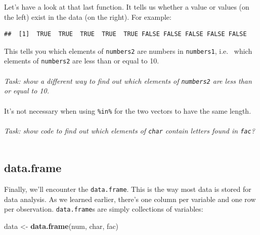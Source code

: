 \documentclass[
]{book}
\newenvironment{Shaded}{\begin{snugshade}}{\end{snugshade}}
\newcommand{\KeywordTok}[1]{\textcolor[rgb]{0.13,0.29,0.53}{\textbf{#1}}}
\newcommand{\NormalTok}[1]{#1}
\newcommand{\OperatorTok}[1]{\textcolor[rgb]{0.81,0.36,0.00}{\textbf{#1}}}
\newcommand{\StringTok}[1]{\textcolor[rgb]{0.31,0.60,0.02}{#1}}
\begin{document}
Let's have a look at that last function. It tells us whether a value or values
(on the left) exist in the data (on the right). For example:

\begin{Shaded}
\end{Shaded}

\begin{verbatim}
##  [1]  TRUE  TRUE  TRUE  TRUE  TRUE FALSE FALSE FALSE FALSE FALSE
\end{verbatim}

This tells you which elements of \texttt{numbers2} are numbers in \texttt{numbers1}, i.e.~
which elements of \texttt{numbers2} are less than or equal to 10.\\
~\\

\emph{Task: show a different way to find out which elements of \texttt{numbers2} are less
than or equal to 10.}\\
~\\

It's not necessary when using \texttt{\%in\%} for the two vectors to have the same length.\\
~\\

\emph{Task: show code to find out which elements of \texttt{char} contain letters found in \texttt{fac}?}\\
~\\

\hypertarget{data.frame}{%
\subsection{data.frame}\label{data.frame}}

Finally, we'll encounter the \texttt{data.frame}. This is the way most data is
stored for data analysis. As we learned earlier, there's one column per variable
and one row per observation. \texttt{data.frame}s are simply collections of variables:

\begin{Shaded}
\begin{Highlighting}[]
\NormalTok{data <-}\StringTok{ }\KeywordTok{data.frame}\NormalTok{(num, char, fac)}
\end{Highlighting}
\end{Shaded}
\end{document}
